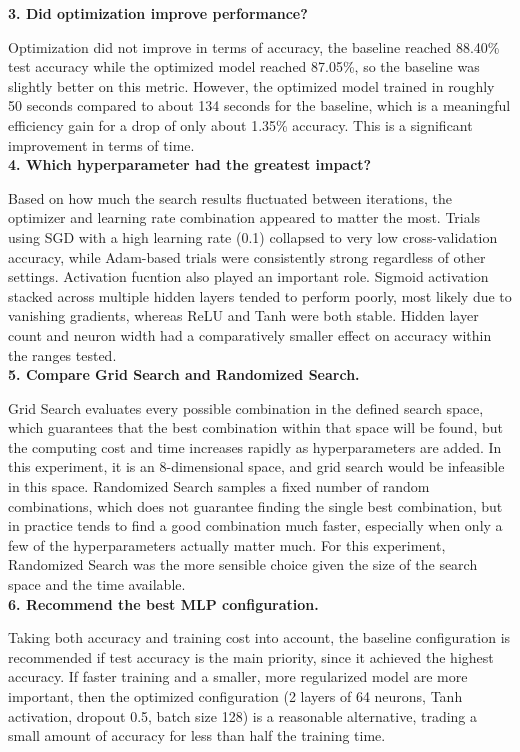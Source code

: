 \documentclass[11pt]{article}
\begin{document}
\textbf{3. Did optimization improve performance?}

Optimization did not improve in terms of accuracy, the baseline reached 88.40\% test accuracy while the optimized model reached 87.05\%, so the baseline was slightly better on this metric. 
However, the optimized model trained in roughly 50 seconds compared to about 134 seconds for the baseline, which is a meaningful efficiency gain for a drop of only about 1.35\% accuracy. This is a significant improvement in terms of time. \\

\textbf{4. Which hyperparameter had the greatest impact?}

Based on how much the search results fluctuated between iterations, the optimizer and learning rate combination appeared to matter the most. Trials using SGD with a high learning rate (0.1) collapsed to very low cross-validation accuracy, while Adam-based trials were consistently strong regardless of other settings. Activation fucntion also played an important role. Sigmoid activation stacked across multiple hidden layers tended to perform poorly, most likely due to vanishing gradients, whereas ReLU and Tanh were both stable. Hidden layer count and neuron width had a comparatively smaller effect on accuracy within the ranges tested.\\

\textbf{5. Compare Grid Search and Randomized Search.}

Grid Search evaluates every possible combination in the defined search space, which guarantees that the best combination within that space will be found, but the computing cost and time increases rapidly as hyperparameters are added. In this experiment, it is an 8-dimensional space, and grid search would be infeasible in this space. Randomized Search samples a fixed number of random combinations, which does not guarantee finding the single best combination, but in practice tends to find a good combination much faster, especially when only a few of the hyperparameters actually matter much. For this experiment, Randomized Search was the more sensible choice given the size of the search space and the time available.\\

\textbf{6. Recommend the best MLP configuration.}

Taking both accuracy and training cost into account, the baseline configuration is recommended if test accuracy is the main priority, since it achieved the highest accuracy. If faster training and a smaller, more regularized model are more important, then the optimized configuration (2 layers of 64 neurons, Tanh activation, dropout 0.5, batch size 128) is a reasonable alternative, trading a small amount of accuracy for less than half the training time. \\\\
\end{document}
